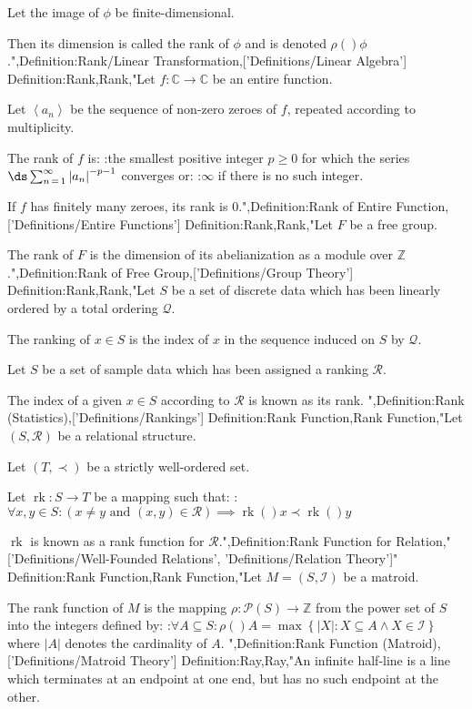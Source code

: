 Let the image of $\phi$ be finite-dimensional.


Then its dimension is called the rank of $\phi$ and is denoted $\rho \left(   \right)\phi$.",Definition:Rank/Linear Transformation,['Definitions/Linear Algebra']
Definition:Rank,Rank,"Let $f: \mathbb C \to \mathbb C$ be an entire function.

Let $\left\langle a_n \right\rangle$ be the sequence of non-zero zeroes of $f$, repeated according to multiplicity.


The rank of $f$ is:
:the smallest positive integer $p \ge 0$ for which the series $\ds \sum_{n \mathop = 1}^\infty \left\lvert a_n \right\rvert^{-p - 1}$ converges
or:
:$\infty$ if there is no such integer.


If $f$ has finitely many zeroes, its rank is $0$.",Definition:Rank of Entire Function,['Definitions/Entire Functions']
Definition:Rank,Rank,"Let $F$ be a free group.


The rank of $F$ is the dimension of its abelianization as a module over $\mathbb Z$.",Definition:Rank of Free Group,['Definitions/Group Theory']
Definition:Rank,Rank,"Let $S$ be a set of discrete data which has been linearly ordered by a total ordering $\mathcal Q$.

The ranking of $x \in S$ is the index of $x$ in the sequence induced on $S$ by $\mathcal Q$.



Let $S$ be a set of sample data which has been assigned a ranking $\mathcal R$.

The index of a given $x \in S$ according to $\mathcal R$ is known as its rank.
",Definition:Rank (Statistics),['Definitions/Rankings']
Definition:Rank Function,Rank Function,"Let $\left( S, \mathcal R \right)$ be a relational structure.

Let $\left( T, \prec \right)$ be a strictly well-ordered set.

Let $\operatorname {rk}: S \to T$ be a mapping such that:
:$\forall x, y \in S: \left( x \ne y \text { and } \left( x, y \right) \in \mathcal R \right) \implies \operatorname {rk}  \left(   \right)x \prec \operatorname {rk}  \left(   \right)y$


$\operatorname {rk}$ is known as a rank function for $\mathcal R$.",Definition:Rank Function for Relation,"['Definitions/Well-Founded Relations', 'Definitions/Relation Theory']"
Definition:Rank Function,Rank Function,"Let $M = \left( S, \mathscr I \right)$ be a matroid.


The rank function of $M$ is the mapping $\rho : \mathcal P \left( S \right) \to \mathbb Z$ from the power set of $S$ into the integers defined by:
:$\forall A \subseteq S : \rho \left(   \right)A = \max \left\lbrace \left\lvert X \right\rvert : X \subseteq A \land X \in \mathscr I \right\rbrace$
where $\left\lvert A \right\rvert$ denotes the cardinality of $A$.
",Definition:Rank Function (Matroid),['Definitions/Matroid Theory']
Definition:Ray,Ray,"An infinite half-line is a line which terminates at an endpoint at one end, but has no such endpoint at the other.


